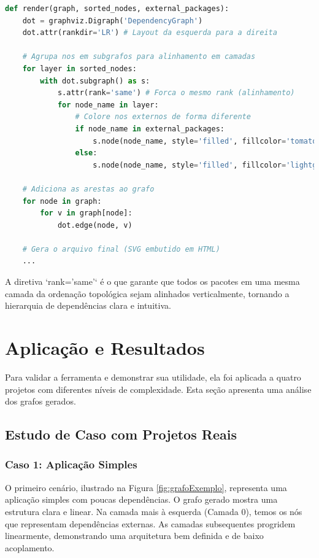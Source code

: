 \documentclass[12pt]{article}
\begin{document}
\begin{lstlisting}[language=Python, caption={Trecho do código de renderização do grafo.}, label={lst:render}]
def render(graph, sorted_nodes, external_packages):
    dot = graphviz.Digraph('DependencyGraph')
    dot.attr(rankdir='LR') # Layout da esquerda para a direita

    # Agrupa nos em subgrafos para alinhamento em camadas
    for layer in sorted_nodes:
        with dot.subgraph() as s:
            s.attr(rank='same') # Forca o mesmo rank (alinhamento)
            for node_name in layer:
                # Colore nos externos de forma diferente
                if node_name in external_packages:
                    s.node(node_name, style='filled', fillcolor='tomato')
                else:
                    s.node(node_name, style='filled', fillcolor='lightgrey')
    
    # Adiciona as arestas ao grafo
    for node in graph:
        for v in graph[node]:
            dot.edge(node, v)
    
    # Gera o arquivo final (SVG embutido em HTML)
    ...
\end{lstlisting}

A diretiva `rank='same'` é o que garante que todos os pacotes em uma mesma camada da ordenação topológica sejam alinhados verticalmente, tornando a hierarquia de dependências clara e intuitiva.

\FloatBarrier

\section{Aplicação e Resultados}
Para validar a ferramenta e demonstrar sua utilidade, ela foi aplicada a quatro projetos com diferentes níveis de complexidade. Esta seção apresenta uma análise dos grafos gerados.

\subsection{Estudo de Caso com Projetos Reais}

\subsubsection{Caso 1: Aplicação Simples}
O primeiro cenário, ilustrado na Figura \ref{fig:grafoExemplo}, representa uma aplicação simples com poucas
dependências. O grafo gerado mostra uma estrutura clara e linear. Na camada mais à esquerda (Camada 0), temos os nós que
representam dependências externas. As camadas subsequentes progridem linearmente, demonstrando uma arquitetura bem definida e de baixo acoplamento.
\end{document}
